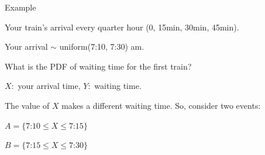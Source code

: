 \begin{frame}{Example }

{

\bigskip




\plitemsep 0.1in
\bci
\item<1-> Your train's arrival every quarter hour (0, 15min, 30min, 45min).

\item<1-> Your arrival $\sim$ uniform(7:10, 7:30) am.

\item<2-> What is the PDF of waiting time for the first train?

\item<3-> $X:$ your arrival time, $Y:$ waiting time.

\item<4-> The value of $X$ makes a different waiting time. So, consider two events:

\medskip
$A = \{\text{7:10} \leq X \leq \text{7:15} \}$

\medskip
$B = \{\text{7:15} \leq X \leq \text{7:30} \}$

\eci
}
{
\small
{}
}

\end{frame}

